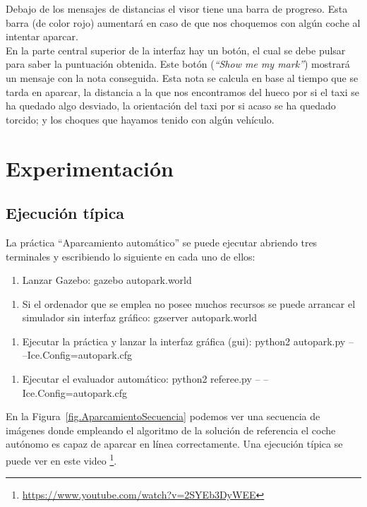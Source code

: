 Debajo de los mensajes de distancias el visor tiene una barra de progreso. Esta barra (de color rojo) aumentará en caso de que nos choquemos con algún coche al intentar aparcar. \\


En la parte central superior de la interfaz hay un botón, el cual se debe pulsar para saber la puntuación obtenida. Este botón (\textit{``Show me my mark''}) mostrará un mensaje con la nota conseguida. Esta nota se calcula en base al tiempo que se tarda en aparcar, la distancia a la que nos encontramos del hueco por si el taxi se ha quedado algo desviado, la orientación del taxi por si acaso se ha quedado torcido; y los choques que hayamos tenido con algún vehículo. 



\section{Experimentación}

\subsection{Ejecución típica}
La práctica “Aparcamiento automático” se puede ejecutar abriendo tres terminales y escribiendo lo siguiente en cada uno de ellos:

\begin{enumerate}[1.]
\item Lanzar Gazebo: gazebo autopark.world
\end{enumerate}
\begin{enumerate}[1b.]
\item Si el ordenador que se emplea no posee muchos recursos se puede arrancar el simulador sin interfaz gráfico: gzserver autopark.world
\end{enumerate}
\begin{enumerate}[2.]
\item	Ejecutar la práctica y lanzar la interfaz gráfica (\acrshort{gui}): python2 autopark.py -- --Ice.Config=autopark.cfg
\end{enumerate}
\begin{enumerate}[3.]
\item	Ejecutar el evaluador automático: python2 referee.py -- --Ice.Config=autopark.cfg
\end{enumerate}

En la Figura~\ref{fig.AparcamientoSecuencia} podemos ver una secuencia de imágenes donde empleando el algoritmo de la solución de referencia el coche autónomo es capaz de aparcar en línea correctamente. Una ejecución típica se puede ver en este video \footnote{\url{https://www.youtube.com/watch?v=2SYEb3DyWEE}}. 

